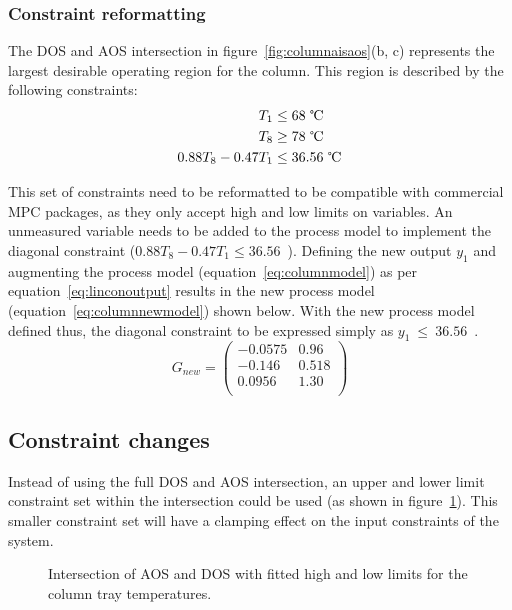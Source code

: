 \documentclass[final,authoryear,5pt,times,twocolumn]{elsarticle}
\newcommand{\bpm}{\begin{pmatrix}} %
\newcommand{\epm}{\end{pmatrix}}
\begin{document}
\subsubsection{Constraint reformatting}
The DOS and AOS intersection in figure~\ref{fig:columnaisaos}(b, c) represents the largest desirable operating region for the column.
This region is described by the following constraints:
\begin{align*}
  T_1 &\leq 68\text{~\textcelsius} \\
  T_8 &\geq 78\text{~\textcelsius} \\
  0.88T_8-0.47T_1&\leq 36.56\text{~\textcelsius}
\end{align*}

This set of constraints need to be reformatted to be compatible with commercial MPC packages, as they only accept high and low limits on variables.
An unmeasured variable needs to be added to the process model to implement the diagonal constraint ($0.88T_8-0.47T_1\leq 36.56$~\textcelsius).
Defining the new output $y_1$ and augmenting the process model (equation~\ref{eq:columnmodel}) as per equation~\ref{eq:linconoutput} results in the new process model (equation~\ref{eq:columnnewmodel}) shown below. With the new process model defined thus, the diagonal constraint to be expressed simply as {$y_1~\leq~36.56$~\textcelsius}.
\begin{equation}
  \label{eq:columnnewmodel}
  G_{new}= \bpm -0.0575 & 0.96 \\       %
                  -0.146  & 0.518 \\      %
                   0.0956 & 1.30 \\ \epm  %
\end{equation}


\subsection{Constraint changes}
Instead of using the full DOS and AOS intersection, an upper and lower limit constraint set within the intersection could be used (as shown in figure~\ref{fig:columnfitbox}).
This smaller constraint set will have a clamping effect on the input constraints of the system.

\begin{figure}[htbp]
  \centering
    \scalebox{1}{}
  \caption[Fitted constraints for the laboratory distillation column]{Intersection of AOS and DOS with fitted high and low limits for the column tray temperatures.}
  \label{fig:columnfitbox}
\end{figure}
\end{document}
